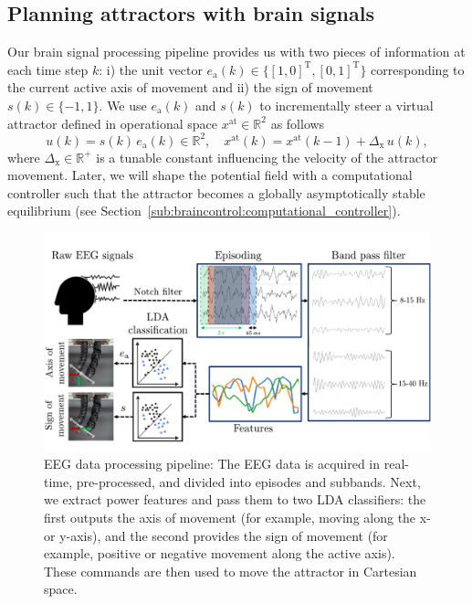 \documentclass[letterpaper, 10pt, conference]{ieeeconf}      %
\begin{document}
\subsection{Planning attractors with brain signals}\label{sub:braincontrol:planning_attractors_switching}
Our brain signal processing pipeline provides us with two pieces of information at each time step $k$: i) the unit vector $e_\mathrm{a}(k) \in \{ [1, 0]^\mathrm{T}, [0, 1]^\mathrm{T} \}$ corresponding to the current active axis of movement %
and ii) the sign of movement $s(k) \in \{ -1, 1 \}$. We use $e_\mathrm{a}(k)$ and $s(k)$ to incrementally steer a virtual attractor defined in operational space $x^\mathrm{at} \in \mathbb{R}^2$ as follows
%
\begin{equation}
    u(k) = s(k) \, e_\mathrm{a}(k) \in \mathbb{R}^2, \quad  x^\mathrm{at}(k) = x^\mathrm{at}(k-1) + \Delta_\mathrm{x} \, u(k),
\end{equation}
where $\Delta_\mathrm{x} \in \mathbb{R}^+$ is a tunable constant influencing the velocity of the attractor movement.
%
Later, we will shape the potential field with a computational controller such that the attractor becomes a globally asymptotically stable equilibrium (see Section~\ref{sub:braincontrol:computational_controller}).

\begin{figure}
\begin{center}
    \includegraphics[width=\columnwidth]{braincontrol/figures/eeg_pipeline/eeg_pipeline_v3_compressed.pdf}
    \caption{EEG data processing pipeline: The EEG data is acquired in real-time, pre-processed, and divided into episodes and subbands. Next, we extract power features and pass them to two LDA classifiers: the first outputs the axis of movement (for example, moving along the x- or y-axis), and the second provides the sign of movement (for example, positive or negative movement along the active axis). These commands are then used to move the attractor in Cartesian space.}
    \label{fig:braincontrol:eeg_pipeline}
\end{center}
\end{figure}
\end{document}
